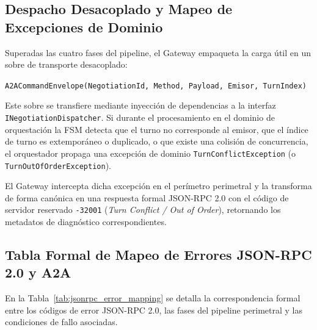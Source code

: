 \subsection{Despacho Desacoplado y Mapeo de Excepciones de Dominio}
Superadas las cuatro fases del pipeline, el Gateway empaqueta la carga útil en un sobre de transporte desacoplado:
\begin{center}
    \texttt{A2ACommandEnvelope(NegotiationId, Method, Payload, Emisor, TurnIndex)}
\end{center}
Este sobre se transfiere mediante inyección de dependencias a la interfaz \texttt{INegotiationDispatcher}. Si durante el procesamiento en el dominio de orquestación la FSM detecta que el turno no corresponde al emisor, que el índice de turno es extemporáneo o duplicado, o que existe una colisión de concurrencia, el orquestador propaga una excepción de dominio \texttt{TurnConflictException} (o \texttt{TurnOutOfOrderException}).

El Gateway intercepta dicha excepción en el perímetro perimetral y la transforma de forma canónica en una respuesta formal JSON-RPC 2.0 con el código de servidor reservado \texttt{-32001} (\textit{Turn Conflict / Out of Order}), retornando los metadatos de diagnóstico correspondientes.

\subsection{Tabla Formal de Mapeo de Errores JSON-RPC 2.0 y A2A}
En la Tabla~\ref{tab:jsonrpc_error_mapping} se detalla la correspondencia formal entre los códigos de error JSON-RPC 2.0, las fases del pipeline perimetral y las condiciones de fallo asociadas.

